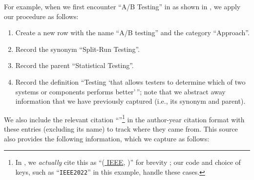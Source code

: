 For example, when we first encounter ``A/B Testing'' in
\citet[p.~1, 36]{IEEE2022} as shown in , we apply
our procedure as follows:
\begin{enumerate}
    \item Create a new row with the name ``A/B testing'' and the category
          ``Approach''.
    \item Record the synonym ``Split-Run Testing''.
    \item Record the parent ``Statistical Testing''.
    \item Record the definition ``Testing `that allows testers to determine
          which of two systems or components performs better'\,''; note that
          we abstract away information that we have previously captured (i.e.,
          its synonym and parent).
\end{enumerate}
We also include the relevant citation \ifnotpaper
    ``\citep[pp.~1, 36]{IEEE2022}''\footnote{In \ourApproachGlossary{}, we
        \emph{actually} cite this as ``(\hyperlink{cite.IEEE2022}{
            \textcolor{blue!50!black}{IEEE}},  %
        \citeyear[pp.~1, 36]{IEEE2022})'' for brevity%
        ; our code and choice of \BibTeX{} keys, such as ``\texttt{IEEE2022}''
        in this example, handle these cases.}
\else in the author-year citation format \fi with these entries (excluding its
name) to track where they came from. This source also provides the following
information, which we capture as follows:
